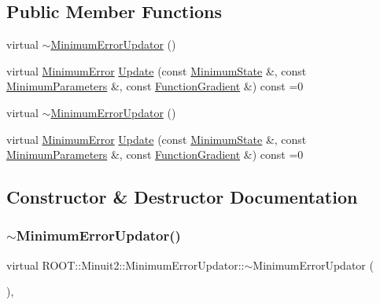 \subsection*{Public Member Functions}
\begin{DoxyCompactItemize}
\item 
virtual \mbox{\hyperlink{classROOT_1_1Minuit2_1_1MinimumErrorUpdator_aae3f2641888e9c351f256a83c455d207}{$\sim$\+Minimum\+Error\+Updator}} ()
\item 
virtual \mbox{\hyperlink{classROOT_1_1Minuit2_1_1MinimumError}{Minimum\+Error}} \mbox{\hyperlink{classROOT_1_1Minuit2_1_1MinimumErrorUpdator_ae75c33152c49ebf34e6119adc0bbbda9}{Update}} (const \mbox{\hyperlink{classROOT_1_1Minuit2_1_1MinimumState}{Minimum\+State}} \&, const \mbox{\hyperlink{classROOT_1_1Minuit2_1_1MinimumParameters}{Minimum\+Parameters}} \&, const \mbox{\hyperlink{classROOT_1_1Minuit2_1_1FunctionGradient}{Function\+Gradient}} \&) const =0
\item 
virtual \mbox{\hyperlink{classROOT_1_1Minuit2_1_1MinimumErrorUpdator_aae3f2641888e9c351f256a83c455d207}{$\sim$\+Minimum\+Error\+Updator}} ()
\item 
virtual \mbox{\hyperlink{classROOT_1_1Minuit2_1_1MinimumError}{Minimum\+Error}} \mbox{\hyperlink{classROOT_1_1Minuit2_1_1MinimumErrorUpdator_ae75c33152c49ebf34e6119adc0bbbda9}{Update}} (const \mbox{\hyperlink{classROOT_1_1Minuit2_1_1MinimumState}{Minimum\+State}} \&, const \mbox{\hyperlink{classROOT_1_1Minuit2_1_1MinimumParameters}{Minimum\+Parameters}} \&, const \mbox{\hyperlink{classROOT_1_1Minuit2_1_1FunctionGradient}{Function\+Gradient}} \&) const =0
\end{DoxyCompactItemize}


\subsection{Constructor \& Destructor Documentation}
\mbox{\label{classROOT_1_1Minuit2_1_1MinimumErrorUpdator_aae3f2641888e9c351f256a83c455d207}} 
\subsubsection{\texorpdfstring{$\sim$MinimumErrorUpdator()}{~MinimumErrorUpdator()}\hspace{0.1cm}{\footnotesize\ttfamily [1/2]}}
{\footnotesize\ttfamily virtual R\+O\+O\+T\+::\+Minuit2\+::\+Minimum\+Error\+Updator\+::$\sim$\+Minimum\+Error\+Updator (\begin{DoxyParamCaption}{ }\end{DoxyParamCaption})\hspace{0.3cm}{\ttfamily [inline]}, {\ttfamily [virtual]}}

